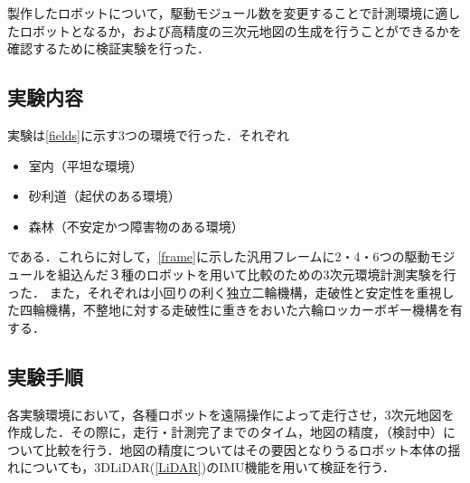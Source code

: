 \par 製作したロボットについて，駆動モジュール数を変更することで計測環境に適したロボットとなるか，および高精度の三次元地図の生成を行うことができるかを確認するために検証実験を行った．
\subsection{実験内容}
\par 実験は\ref{fields}に示す3つの環境で行った．それぞれ
\begin{itemize}
	\item 室内（平坦な環境）
	\item 砂利道（起伏のある環境）
	\item 森林（不安定かつ障害物のある環境）
\end{itemize}
である．これらに対して，\ref{frame}に示した汎用フレームに2・4・6つの駆動モジュールを組込んだ３種のロボットを用いて比較のための3次元環境計測実験を行った．
また，それぞれは小回りの利く独立二輪機構，走破性と安定性を重視した四輪機構，不整地に対する走破性に重きをおいた六輪ロッカーボギー機構を有する．

\subsection{実験手順}
\par 各実験環境において，各種ロボットを遠隔操作によって走行させ，3次元地図を作成した．その際に，走行・計測完了までのタイム，地図の精度，（検討中）について比較を行う．地図の精度についてはその要因となりうるロボット本体の揺れについても，3DLiDAR(\ref{LiDAR})のIMU機能を用いて検証を行う．
